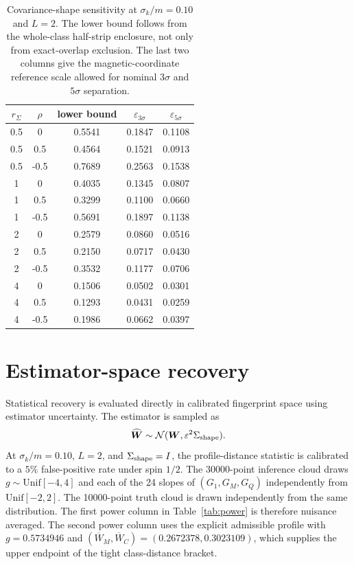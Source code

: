 \documentclass[12pt]{iopjournal}
\newenvironment{ruledtabular}{\centering}{}
\newcommand{\colrule}{\hline}
\begin{document}
\begin{table}[h]
\caption{Covariance-shape sensitivity at $\sigma_k/m=0.10$ and $L=2$. The lower bound follows from the whole-class half-strip enclosure, not only from exact-overlap exclusion. The last two columns give the magnetic-coordinate reference scale allowed for nominal $3\sigma$ and $5\sigma$ separation.}
\label{tab:covariance}
\begin{ruledtabular}
\begin{tabular}{ccccc}
$r_\Sigma$ & $\rho$ & lower bound & $\varepsilon_{3\sigma}$ & $\varepsilon_{5\sigma}$\\
\colrule
0.5 & 0 & 0.5541 & 0.1847 & 0.1108\\
0.5 & 0.5 & 0.4564 & 0.1521 & 0.0913\\
0.5 & -0.5 & 0.7689 & 0.2563 & 0.1538\\
1 & 0 & 0.4035 & 0.1345 & 0.0807\\
1 & 0.5 & 0.3299 & 0.1100 & 0.0660\\
1 & -0.5 & 0.5691 & 0.1897 & 0.1138\\
2 & 0 & 0.2579 & 0.0860 & 0.0516\\
2 & 0.5 & 0.2150 & 0.0717 & 0.0430\\
2 & -0.5 & 0.3532 & 0.1177 & 0.0706\\
4 & 0 & 0.1506 & 0.0502 & 0.0301\\
4 & 0.5 & 0.1293 & 0.0431 & 0.0259\\
4 & -0.5 & 0.1986 & 0.0662 & 0.0397\\
\end{tabular}
\end{ruledtabular}
\end{table}

\section{Estimator-space recovery}

Statistical recovery is evaluated directly in calibrated fingerprint space using estimator uncertainty. The estimator is sampled as
\begin{equation}
\widehat{\bm W}\sim\mathcal N(\bm W,\varepsilon^2\Sigma_{\rm shape}).
\end{equation}
At $\sigma_k/m=0.10$, $L=2$, and $\Sigma_{\rm shape}=I$, the profile-distance statistic is calibrated to a $5\%$ false-positive rate under spin $1/2$. The 30000-point inference cloud draws $g\sim\mathrm{Unif}[-4,4]$ and each of the 24 slopes of $(G_1,G_M,G_Q)$ independently from $\mathrm{Unif}[-2,2]$. The 10000-point truth cloud is drawn independently from the same distribution. The first power column in Table~\ref{tab:power} is therefore nuisance averaged. The second power column uses the explicit admissible profile with $g=0.5734946$ and $(\overline W_M,\overline W_C)=(0.2672378,0.3023109)$, which supplies the upper endpoint of the tight class-distance bracket.
\end{document}
